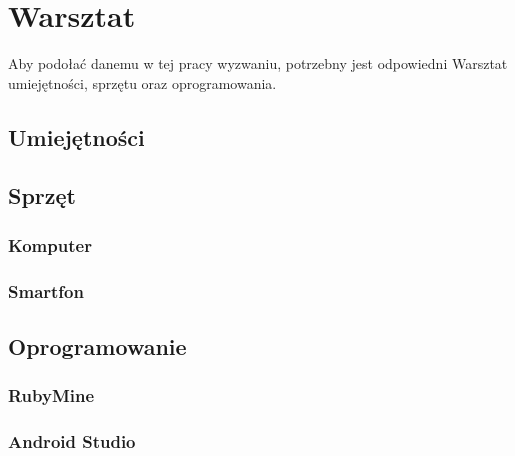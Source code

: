 \chapter{Warsztat}
Aby podołać danemu w tej pracy wyzwaniu, potrzebny jest odpowiedni Warsztat umiejętności, sprzętu oraz oprogramowania.
\section{Umiejętności}
\section{Sprzęt}
\subsection{Komputer}
\subsection{Smartfon}
\section{Oprogramowanie}
\subsection{RubyMine}
\subsection{Android Studio}